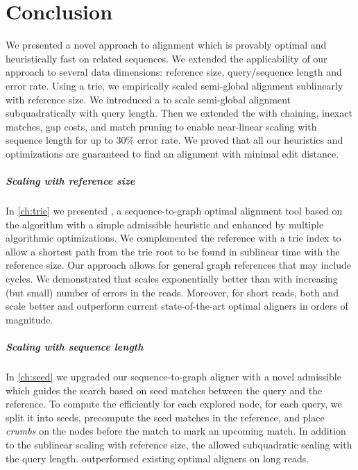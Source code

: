 \chapter*{Conclusion} \label{ch:conclusion}

We presented a novel \A approach to alignment which is provably optimal and
heuristically fast on related sequences. We extended the applicability of our
approach to several data dimensions: reference size, query/sequence length and
error rate. Using a trie, we empirically scaled semi-global alignment
sublinearly with reference size. We introduced a \emph{\sh} to scale semi-global
alignment subquadratically with query length. Then we extended the \sh with
chaining, inexact matches, gap costs, and match pruning to enable near-linear
scaling with sequence length for up to $30\%$ error rate. We proved that all our
heuristics and optimizations are guaranteed to find an alignment with minimal
edit distance.

\paragraph{Scaling with reference size}
In \cref{ch:trie} we presented \astarix, a sequence-to-graph optimal alignment
tool based on the \A algorithm with a simple admissible heuristic and enhanced
by multiple algorithmic optimizations. We complemented the reference with a trie
index to allow a shortest path from the trie root to be found in sublinear time
with the reference size. Our approach allows for general graph references that
may include cycles. We demonstrated that \astarix scales exponentially better
than \dijkstra with increasing (but small) number of errors in the reads.
Moreover, for short reads, both \astarix and \dijkstra scale better and
outperform current state-of-the-art optimal aligners in orders of magnitude.

\paragraph{Scaling with sequence length}
In \cref{ch:seed} we upgraded our sequence-to-graph aligner \astarix with a
novel admissible \emph{\sh} which guides the search based on seed matches
between the query and the reference. To compute the \sh efficiently for each
explored node, for each query, we split it into seeds, precompute the seed
matches in the reference, and place \emph{crumbs} on the nodes before the match
to mark an upcoming match. In addition to the sublinear scaling with reference
size, the \sh allowed subquadratic scaling with the query length. \astarix
outperformed existing optimal aligners on long reads.

